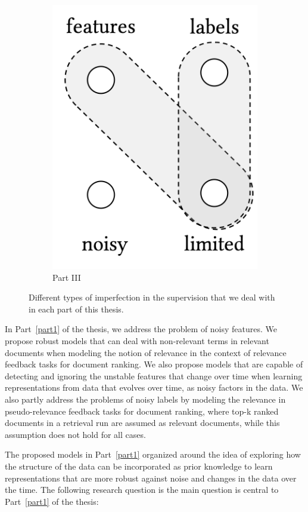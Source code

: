 \begin{figure}[t]
\begin{subfigure}[b]{0.32\textwidth}
        \includegraphics[width=0.55\linewidth]{01-introduction/figs_and_tables/fig_p3.png}
        \caption{\label{fig:p3}Part III}
    \end{subfigure}
\caption{\label{fig:thesis_parts}Different types of imperfection in the supervision that we deal with in each part of this thesis.}
\end{figure}

\bigskip
In Part~\ref{part1} of the thesis, we address the problem of noisy features. We propose robust models that can deal with non-relevant terms in relevant documents when modeling the notion of relevance in the context of relevance feedback tasks for document ranking. We also propose models that are capable of detecting and ignoring the unstable features that change over time when learning representations from data that evolves over time, as noisy factors in the data. We also partly address the problems of noisy labels by modeling the relevance in pseudo-relevance feedback tasks for document ranking, where top-k ranked documents in a retrieval run are assumed as relevant documents, while this assumption does not hold for all cases.

The proposed models in Part~\ref{part1} organized around the idea of exploring how the structure of the data can be incorporated as prior knowledge to learn representations that are more robust against noise and changes in the data over the time. 
The following research question is the main question is central to Part~\ref{part1} of the thesis:

